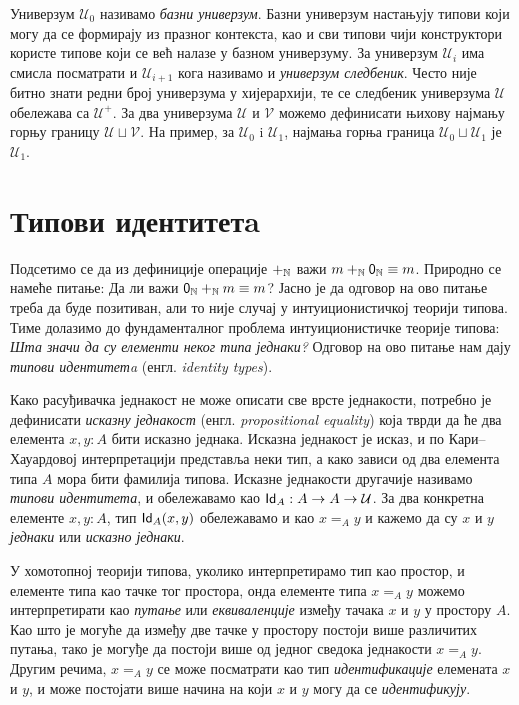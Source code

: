 \documentclass[12pt,oneside]{memoir}
\begin{document}
Универзум $\mathcal{U}_0$ називамо \emph{базни универзум}. Базни универзум настањују типови који могу да се формирају из празног контекста, као и сви типови чији конструктори користе типове који се већ налазе у базном универзуму. За универзум $\mathcal{U}_i$ има смисла посматрати и $\mathcal{U}_{i+1}$ кога називамо и \emph{универзум следбеник}. Често није битно знати редни број универзума у хијерархији, те се следбеник универзума $\mathcal{U}$ обележава са $\mathcal{U}^{+}$. За два универзума
$\mathcal{U}$ и $\mathcal{V}$ можемо дефинисати њихову најмању горњу границу $\mathcal{U} \sqcup \mathcal{V}$. На пример, за $\mathcal{U}_0$ i $\mathcal{U}_1$, најмања горња граница $\mathcal{U}_0 \sqcup \mathcal{U}_1$ је $\mathcal{U}_1$.

\section{Типови идентитетa}

Подсетимо се да из дефиниције операције $+_{\mathbb{N}}$ важи $m +_{\mathbb{N}} \mathsf{0}_\mathbb{N} \equiv m$. Природно се намеће питање: Да ли важи $\mathsf{0}_\mathbb{N} +_{\mathbb{N}} m \equiv m$? Јасно је да одговор на ово питање треба да буде позитиван, али то није случај у интуиционистичкој теорији типова. Тиме долазимо до фундаменталног проблема интуиционистичке теорије типова: \emph{Шта значи да су елементи неког типа једнаки?} Одговор на ово питање нам дају \emph{типови идентитетa} (енгл. \emph{identity types}).

Како расуђивачка једнакост не може описати све врсте једнакости, потребно је дефинисати \emph{исказну једнакост} (енгл. \emph{propositional equality}) која тврди да ће два елемента $x, y : A$ бити исказно једнака. Исказна једнакост је исказ, и по Кари--Хауардовој интерпретацији представља неки тип, а како зависи од два елемента типа $A$ мора бити фамилија типова. Исказне једнакости другачије називамо \emph{типови идентитета}, и обележавамо као $\mathsf{Id}_{A} : A \to A \to
\mathcal{U}$. За два конкретна елементе $x, y : A$, тип $\mathsf{Id}_{A}(x, y)$ обележавамо и као $x =_A y$ и кажемо да су $x$ и $y$ \emph{једнаки} или \emph{исказно једнаки}.

У хомотопној теорији типова, уколико интерпретирамо тип као простор, и елементе типа као тачке тог простора, онда елементе типа $x =_A y$ можемо интерпретирати као \emph{путање} или \emph{еквиваленције} између тачака $x$ и $y$ у простору $A$. Као што је могуће да између две тачке у простору постоји више различитих путања, тако је могуђе да постоји више од једног сведока једнакости $x =_A y$. Другим речима, $x =_A y$ се може посматрати као тип \emph{идентификације} елемената $x$ и $y$, и може постојати више начина на који $x$ и $y$ могу да се \emph{идентификују}. 
\end{document}
